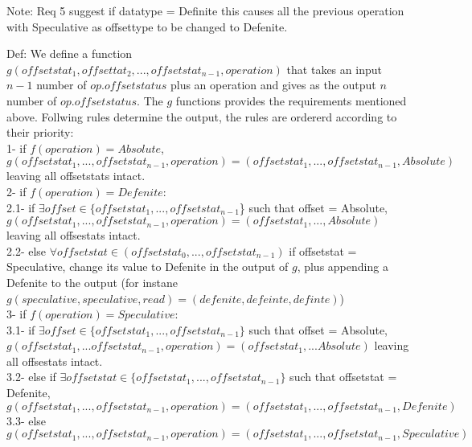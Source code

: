 \documentclass[a4paper, 11pt]{article}
\begin{document}
Note: Req 5 suggest if datatype = Definite this causes all the previous operation with Speculative as offsettype to be changed to Defenite.

Def: We define a function $g(offsetstat_1, offsettat_2, ..., offsetstat_{n-1}, operation)$ that takes an input  $n-1$ number of $op.offsetstatus$ plus an operation and gives as the output $n$ number of $op.offsetstatus$. The $g$ functions provides the requirements mentioned above. Follwing rules determine the output, the rules are ordererd according to their priority:\\

1- if $f(operation) = Absolute$, $g(offsetstat_1, ..., {offsetstat_{n-1}}, operation) = ({offsetstat_1}, ..., {offsetstat_{n-1}}, Absolute)$ leaving all offsetstats intact.\\

2- if $f(operation) = Defenite$:\\

\hspace{ 8mm}
	2.1- if $\exists offset \in \{offsetstat_1, ..., offsetstat_{n-1}$\} such that offset = Absolute,  $g(offsetstat_1, ..., offsetstat_{n-1}, operation) = (offsetstat_1, ... ,Absolute)$ leaving all offsestats intact.\\ 

\hspace{ 8mm}
	2.2- else $\forall offsetstat \in (offsetstat_0, ..., offsetstat_{n-1})$ if offsetstat = Speculative, change its value to Defenite in the output of $g$, plus appending a Defenite to the output (for instane $g(speculative, speculative, read) = (defenite, defeinte, definte)$)\\

3- if $f(operation) = Speculative$:\\

\hspace{ 8mm}
	3.1- if $\exists offset \in \{offsetstat_1, ..., offsetstat_{n-1}\}$ such that offset = Absolute, $g(offsetstat_1, ... offsetstat_{n-1}, operation) = (offsetstat_1, ... Absolute)$ leaving all offsestats intact.\\ 

\hspace{ 8mm}
	3.2- else if $\exists offsetstat \in \{offsetstat_1, ..., offsetstat_{n-1}\}$ such that offsetstat = {Defenite},  $g(offsetstat_1, ...,  offsetstat_{n-1}, operation) = (offsetstat_1 ,..., offsetstat_{n-1}, Defenite)$\\

\hspace{ 8mm}
	3.3- else $g(offsetstat_1, ..., offsetstat_{n-1}, operation) = (offsetstat_1, ..., offsetstat_{n-1}, Speculative)$\\
\end{document}
